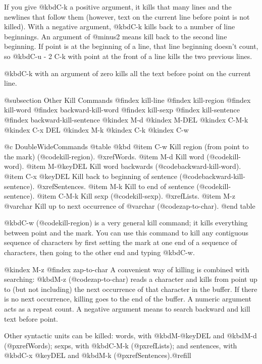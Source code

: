 {{{{  If you give @kbd{C-k} a positive argument, it kills that many lines
and the newlines that follow them (however, text on the current line
before point is not killed).  With a negative argument, @kbd{C-k} kills
back to a number of line beginnings.  An argument of @minus{}2 means
kill back to the second line beginning.  If point is at the beginning of
a line, that line beginning doesn't count, so @kbd{C-u - 2 C-k} with
point at the front of a line kills the two previous lines.

  @kbd{C-k} with an argument of zero kills all the text before point on the
current line.

@subsection Other Kill Commands
@findex kill-line
@findex kill-region
@findex kill-word
@findex backward-kill-word
@findex kill-sexp
@findex kill-sentence
@findex backward-kill-sentence
@kindex M-d
@kindex M-DEL
@kindex C-M-k
@kindex C-x DEL
@kindex M-k
@kindex C-k
@kindex C-w

@c DoubleWideCommands
@table @kbd
@item C-w
Kill region (from point to the mark) (@code{kill-region}).
@xref{Words}.
@item M-d
Kill word (@code{kill-word}).
@item M-@key{DEL}
Kill word backwards (@code{backward-kill-word}).
@item C-x @key{DEL}
Kill back to beginning of sentence (@code{backward-kill-sentence}).
@xref{Sentences}.
@item M-k
Kill to end of sentence (@code{kill-sentence}).
@item C-M-k
Kill sexp (@code{kill-sexp}).  @xref{Lists}.
@item M-z @var{char}
Kill up to next occurrence of @var{char} (@code{zap-to-char}).
@end table

   @kbd{C-w} (@code{kill-region}) is a very general kill command; it
kills everything between point and the mark. You can use this command to
kill any contiguous sequence of characters by first setting the mark at
one end of a sequence of characters, then going to the other end and
typing @kbd{C-w}.

@kindex M-z
@findex zap-to-char
  A convenient way of killing is combined with searching: @kbd{M-z}
(@code{zap-to-char}) reads a character and kills from point up to (but not
including) the next occurrence of that character in the buffer.  If there
is no next occurrence, killing goes to the end of the buffer.  A numeric
argument acts as a repeat count.  A negative argument means to search
backward and kill text before point.

  Other syntactic units can be killed: words, with @kbd{M-@key{DEL}} and
@kbd{M-d} (@pxref{Words}); sexps, with @kbd{C-M-k} (@pxref{Lists}); and
sentences, with @kbd{C-x @key{DEL}} and @kbd{M-k}
(@pxref{Sentences}).@refill

}}}}
